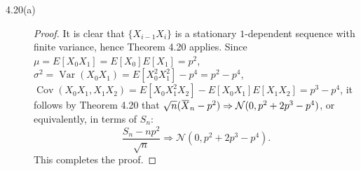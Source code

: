 \documentclass{article}
\newcommand{\overbar}[1]{\mkern 1.5mu\overline{\mkern-1.5mu#1\mkern-1.5mu}\mkern 1.5mu}
\newcommand{\gaussian}{\mathcal{N}}
\DeclareMathOperator*{\Var}{Var}
\DeclareMathOperator*{\Cov}{Cov}
\theoremstyle{definition}
\theoremstyle{plain}
\theoremstyle{remark}
\begin{document}
\begin{description}
\begin{comment}
On the other hand, we have
\begin{align*}
\frac{s_{\ell_n}^2}{n} & = \frac{\ell_nk_n}{n}\sigma^2 + 2\frac{\ell_nk_n}{n} \sum_{k = 1}^m \Cov(X_1, X_{1 + k}) -  2\frac{\ell_n}{n} \sum_{k = 1}^m k\Cov(X_1, X_{1 + k}) \\
& \to \sigma^2 + 2 \sum_{k = 1}^m \Cov(X_1, X_{1 + k}) = \tau^2,
\end{align*}
in view of $\ell_nk_n/n \to 1$ and $\ell_n/n \to 0$ as $n \to \infty$. The desired result then follows from Slutsky's theorem. 
\end{proof}
\end{description}
\end{comment}

\item[4.20(a)]
\begin{proof}
It is clear that $\{X_{i - 1}X_i\}$ is a stationary $1$-dependent sequence with 
finite variance, hence Theorem 4.20 applies. Since $\mu = E[X_0X_1] = E[X_0]E[X_1] 
= p^2$, $\sigma^2 = \Var(X_0X_1) = E[X_0^2X_1^2] - p^4 = p^2 - p^4$, $\Cov(X_0X_1,
X_1X_2) = E[X_0X_1^2X_2] - E[X_0X_1]E[X_1X_2] = p^3 - p^4$, it follows by Theorem
4.20 that $\sqrt{n}(\overbar{X}_n - p^2) \Rightarrow \gaussian(0, p^2 + 2p^3 -
p^4)$,
or equivalently, in terms of $S_n$:
\begin{equation*}
    \frac{S_n - np^2}{\sqrt{n}} \Rightarrow \gaussian(0, p^2 + 2p^3 - p^4).
\end{equation*}
This completes the proof.
\end{proof}


\end{description}
\end{document}
